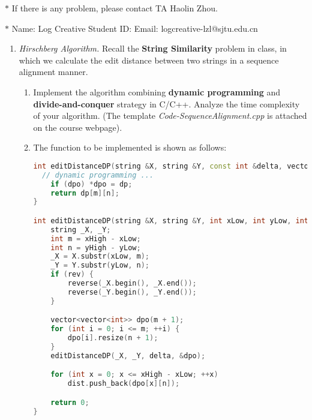 \documentclass[12pt,a4paper]{article}
\makeatletter
\newtheorem*{solution}{Solution}
\theoremstyle{definition}
\renewenvironment{solution}[1][Solution] {\par\pushQED{\qed}\normalfont\topsep6\p@\@plus6\p@\relax\trivlist\item[\hskip\labelsep\bfseries#1\@addpunct{.}]\ignorespaces}{\popQED\endtrivlist\@endpefalse} \makeatother
\makeatother
\begin{document}
\noindent

\noindent{}
\begin{center}
\footnotesize{\color{red}$*$ If there is any problem, please contact TA Haolin Zhou.}

\footnotesize{\color{blue}$*$ Name: Log Creative  \quad Student ID:  \quad Email: logcreative-lzl@sjtu.edu.cn}
\end{center}

\begin{enumerate}
    \item
    \textit{Hirschberg Algorithm.} Recall the \textbf{String Similarity} problem in class, in which we calculate the edit distance between two strings in a sequence alignment manner.
    \begin{enumerate}
    	\item
    	Implement the algorithm combining \textbf{dynamic programming} and \textbf{divide-and-conquer} strategy in C/C++. Analyze the time complexity of your algorithm. {\color{blue}(The template \emph{Code-SequenceAlignment.cpp} is attached on the course webpage)}.
    	
      \begin{solution}
      The function to be implemented is shown as follows:
      \begin{lstlisting}[language=c++]
int editDistanceDP(string &X, string &Y, const int &delta, vector<vector<int>> *dpo = NULL) {
  // dynamic programming ...
	if (dpo) *dpo = dp;
	return dp[m][n];
}

int editDistanceDP(string &X, string &Y, int xLow, int yLow, int xHigh, int yHigh, const int &delta, bool rev, vector<int> &dist) {
	string _X, _Y;
	int m = xHigh - xLow;
	int n = yHigh - yLow;
	_X = X.substr(xLow, m);
	_Y = Y.substr(yLow, n);
	if (rev) {
		reverse(_X.begin(), _X.end());
		reverse(_Y.begin(), _Y.end());
	}

	vector<vector<int>> dpo(m + 1);
	for (int i = 0; i <= m; ++i) {
		dpo[i].resize(n + 1);
	}
	editDistanceDP(_X, _Y, delta, &dpo);

	for (int x = 0; x <= xHigh - xLow; ++x) 
		dist.push_back(dpo[x][n]);

	return 0;
}
      \end{lstlisting}


\end{solution}
\end{enumerate}
\end{enumerate}
\end{document}
